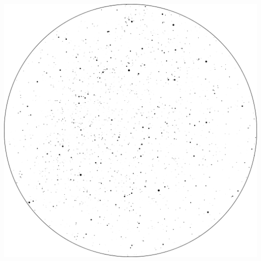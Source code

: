 \documentclass{SAS-class-skygen}
\begin{document}
	\vspace{0.5cm}
    \begin{center}
    \includegraphics[width=\textwidth]{./pics/sky_chart10.png}
    \end{center}
    
    
\end{document}
